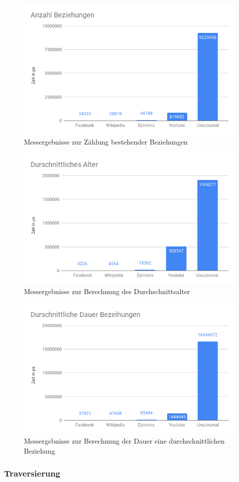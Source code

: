 \begin{figure}
	\centering
	\includegraphics[width=\textwidth]{images/AnzahlBeziehung.png}
	\caption{Messergebnisse zur Zählung bestehender Beziehungen}
	\label{fig:AnzahlBeziehung}
\end{figure}

\begin{figure}
	\centering
	\includegraphics[width=\textwidth]{images/DurschAlter.png}
	\caption{Messergebnisse zur Berechnung des Durchschnittsalter}
	\label{fig:DurschAlter}
\end{figure}

\begin{figure}
	\centering
	\includegraphics[width=\textwidth]{images/DurschBeziehung.png}
	\caption{Messergebnisse zur Berechnung der Dauer eine durchschnittlichen Beziehung}
	\label{fig:DurschBeziehung}
\end{figure}
\subsubsection{Traversierung}
